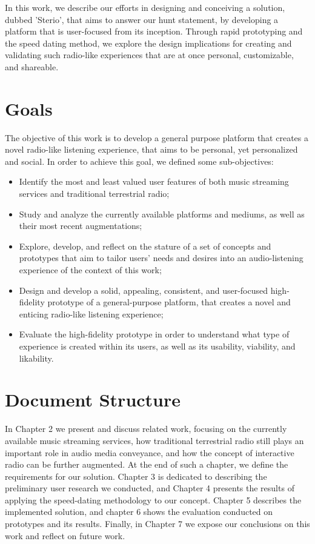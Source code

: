 In this work, we describe our efforts in designing and conceiving a solution, dubbed 'Sterio', that aims to answer our hunt statement, by developing a platform that is user-focused from its inception. Through rapid prototyping and the speed dating method, we explore the design implications for creating and validating such radio-like experiences that are at once personal, customizable, and shareable.

\section{Goals}

The objective of this work is to develop a general purpose platform that creates a novel radio-like listening experience, that aims to be personal, yet personalized and social. In order to achieve this goal, we defined some sub-objectives:

\begin{itemize}
	\item Identify the most and least valued user features of both music streaming services and traditional terrestrial radio;
	\item Study and analyze the currently available platforms and mediums, as well as their most recent augmentations; 
	\item Explore, develop, and reflect on the stature of a set of concepts and prototypes that aim to tailor users' needs and desires into an audio-listening experience of the context of this work;
	\item Design and develop a solid, appealing, consistent, and user-focused high-fidelity prototype of a general-purpose platform, that creates a novel and enticing radio-like listening experience;
	\item Evaluate the high-fidelity prototype in order to understand what type of experience is created within its users, as well as its usability, viability, and likability.
\end{itemize}



\section{Document Structure}

In Chapter 2 we present and discuss related work, focusing on the currently available music streaming services, how traditional terrestrial radio still plays an important role in audio media conveyance, and how the concept of interactive radio can be further augmented. At the end of such a chapter, we define the requirements for our solution. Chapter 3 is dedicated to describing the preliminary user research we conducted, and Chapter 4 presents the results of applying the speed-dating methodology to our concept. Chapter 5 describes the implemented solution, and chapter 6 shows the evaluation conducted on prototypes and its results. Finally, in Chapter 7 we expose our conclusions on this work and reflect on future work.

